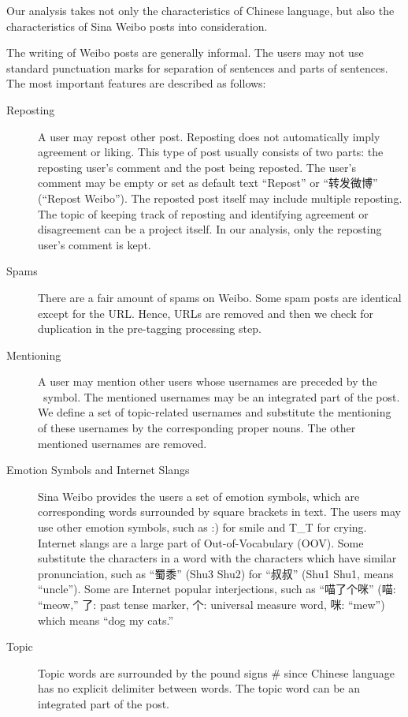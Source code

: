 \documentclass[11pt]{article}
\newcommand{\1}[1]{{\mathbf 1}\left\{#1\right\}}        %
\begin{document}
Our analysis takes not only the characteristics of Chinese language, but also the characteristics of Sina Weibo posts into consideration.

The writing of Weibo posts are generally informal. The users may not use standard punctuation marks for separation of sentences and parts of sentences. The most important features are described as follows:

\begin{description}
\item[Reposting] A user may repost other post. Reposting does not automatically imply agreement or liking. This type of post usually consists of two parts: the reposting user's comment and the post being reposted. The user's comment may be empty or set as default text ``Repost'' or ``转发微博'' (``Repost Weibo''). The reposted post itself may include multiple reposting. The topic of keeping track of reposting and identifying agreement or disagreement can be a project itself. In our analysis, only the reposting user's comment is kept.  

\item[Spams] There are a fair amount of spams on Weibo. Some spam posts are identical except for the URL. Hence, URLs are removed and then we check for duplication in the pre-tagging processing step.

\item[Mentioning] A user may mention other users whose usernames are preceded by the \MVAt\  symbol. The mentioned usernames may be an integrated part of the post. We define a set of topic-related usernames and substitute the mentioning of these usernames by the corresponding proper nouns. The other mentioned usernames are removed.

\item[Emotion Symbols and Internet Slangs] Sina Weibo provides the users a set of emotion symbols, which are corresponding words surrounded by square brackets in text. The users may use other emotion symbols, such as {\ttfamily :)} for smile and {\ttfamily T\_T} for crying. Internet slangs are a large part of Out-of-Vocabulary (OOV). Some substitute the characters in a word with the characters which have similar pronunciation, such as ``蜀黍'' (Shu3 Shu2) for ``叔叔'' (Shu1 Shu1, means ``uncle''). Some are Internet popular interjections, such as ``喵了个咪'' (喵: ``meow,'' 了: past tense marker, 个: universal measure word, 咪: ``mew'') which means ``dog my cats.'' 

\item[Topic] Topic words are surrounded by the pound signs {\ttfamily \#} since Chinese language has no explicit delimiter between words. The topic word can be an integrated part of the post. 

\end{description}
\end{document}
